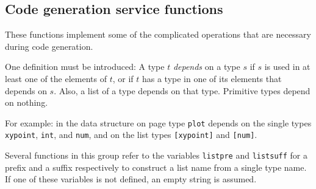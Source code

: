 \subsection{Code generation service functions}
These functions implement some of the complicated operations that
are necessary during code generation. 
\par
One definition must be introduced:
A type $t$ {\em depends} \/on a type $s$ if $s$
is used in at least one of the elements of $t$,
or if $t$ has a type in one of its elements that depends on $s$.
Also,
a list of a type depends on that type.
Primitive types depend on nothing.
\par
For example:
in the data structure on page \pageref{plotds} type {\tt plot}
depends on the single types {\tt xypoint}, {\tt int}, and {\tt num},
and on the list types {\tt [xypoint]} and {\tt [num]}.
\par
Several functions in this group refer to the {\Tm} variables \verb+listpre+
and \verb+listsuff+ for a prefix and a suffix respectively to construct
a list name from a single type name.
If one of these variables is not defined, an empty string is assumed.
\par
